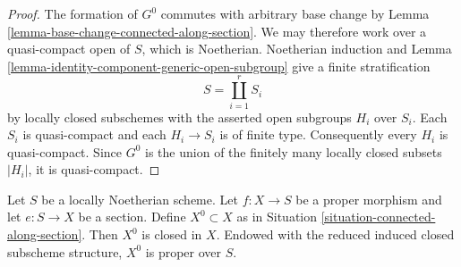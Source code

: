 \begin{proof}
The formation of $G^0$ commutes with arbitrary base change by
Lemma \ref{lemma-base-change-connected-along-section}. We may therefore
work over a quasi-compact open of $S$, which is Noetherian. Noetherian
induction and
Lemma \ref{lemma-identity-component-generic-open-subgroup} give a finite
stratification
$$
S = \coprod_{i = 1}^r S_i
$$
by locally closed subschemes with the asserted open subgroups $H_i$ over
$S_i$. Each $S_i$ is quasi-compact and each $H_i \to S_i$ is of finite
type. Consequently every $H_i$ is quasi-compact. Since $G^0$ is the union
of the finitely many locally closed subsets $|H_i|$, it is quasi-compact.
\end{proof}

\begin{lemma}
\label{lemma-connected-along-section-proper}
Let $S$ be a locally Noetherian scheme. Let $f : X \to S$ be a proper
morphism and let $e : S \to X$ be a section. Define $X^0 \subset X$ as in
Situation \ref{situation-connected-along-section}. Then $X^0$ is closed in
$X$. Endowed with the reduced induced closed subscheme structure, $X^0$ is
proper over $S$.
\end{lemma}

